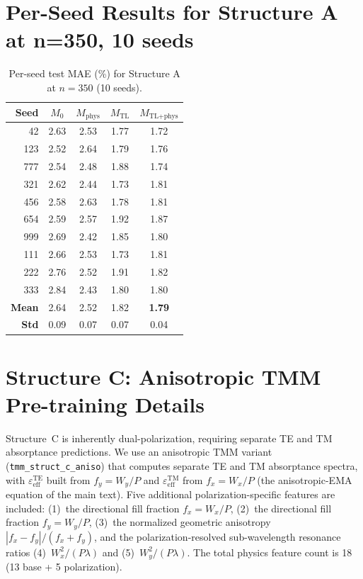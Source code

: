 \documentclass[11pt]{article}
\newcommand{\Mzero}{\ensuremath{M_0}}
\newcommand{\Mphys}{\ensuremath{M_\text{phys}}}
\newcommand{\Mtl}{\ensuremath{M_\text{TL}}}
\newcommand{\Mtlphys}{\ensuremath{M_\text{TL+phys}}}
\begin{document}
\section{Per-Seed Results for Structure A at n=350, 10 seeds}
\label{sec:si_per_seed}

\begin{table}[htbp]\centering\footnotesize
\caption{Per-seed test MAE (\%) for Structure A at $n=350$ (10 seeds).}
\label{tab:per_seed_a}
\begin{tabular}{r cccc}\toprule
\textbf{Seed} & $\Mzero$ & $\Mphys$ & $\Mtl$ & $\Mtlphys$\\\midrule
42  & 2.63 & 2.53 & 1.77 & 1.72\\
123 & 2.52 & 2.64 & 1.79 & 1.76\\
777 & 2.54 & 2.48 & 1.88 & 1.74\\
321 & 2.62 & 2.44 & 1.73 & 1.81\\
456 & 2.58 & 2.63 & 1.78 & 1.81\\
654 & 2.59 & 2.57 & 1.92 & 1.87\\
999 & 2.69 & 2.42 & 1.85 & 1.80\\
111 & 2.66 & 2.53 & 1.73 & 1.81\\
222 & 2.76 & 2.52 & 1.91 & 1.82\\
333 & 2.84 & 2.43 & 1.80 & 1.80\\
\midrule
\textbf{Mean} & 2.64 & 2.52 & 1.82 & \textbf{1.79}\\
\textbf{Std}  & 0.09 & 0.07 & 0.07 & 0.04\\\bottomrule
\end{tabular}
\end{table}


\section{Structure C: Anisotropic TMM Pre-training Details}
\label{sec:si_struct_c}

Structure~C is inherently dual-polarization, requiring separate TE and TM absorptance predictions. We use an anisotropic TMM variant (\texttt{tmm\_struct\_c\_aniso}) that computes separate TE and TM absorptance spectra, with $\varepsilon_\text{eff}^\text{TE}$ built from $f_y = W_y/P$ and $\varepsilon_\text{eff}^\text{TM}$ from $f_x = W_x/P$ (the anisotropic-EMA equation of the main text). Five additional polarization-specific features are included: (1)~the directional fill fraction $f_x = W_x/P$, (2)~the directional fill fraction $f_y = W_y/P$, (3)~the normalized geometric anisotropy $|f_x - f_y|/(f_x + f_y)$, and the polarization-resolved sub-wavelength resonance ratios (4)~$W_x^2/(P\lambda)$ and (5)~$W_y^2/(P\lambda)$. The total physics feature count is 18 (13 base + 5 polarization).
\end{document}
